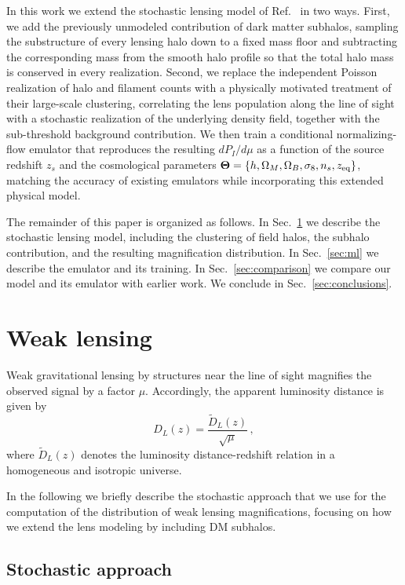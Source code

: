 \documentclass[aps,prd,10pt,nofootinbib,twocolumn,superscriptaddress,floatfix,notitlepage]{revtex4-1}
\newcommand{\vect}[1]{\boldsymbol{#1}}
\newcommand{\be}{\begin{equation}}
\newcommand{\ee}{\end{equation}}
\begin{document}
In this work we extend the stochastic lensing model of Ref.~\cite{Vaskonen:2026ubd} in two ways. First, we add the previously unmodeled contribution of dark matter subhalos, sampling the substructure of every lensing halo down to a fixed mass floor and subtracting the corresponding mass from the smooth halo profile so that the total halo mass is conserved in every realization. Second, we replace the independent Poisson realization of halo and filament counts with a physically motivated treatment of their large-scale clustering, correlating the lens population along the line of sight with a stochastic realization of the underlying density field, together with the sub-threshold background contribution. We then train a conditional normalizing-flow emulator that reproduces the resulting $dP_I/d\mu$ as a function of the source redshift $z_s$ and the cosmological parameters $\vect\Theta = \{h,\Omega_M,\Omega_B,\sigma_8,n_s,z_{\rm eq}\}$, matching the accuracy of existing emulators while incorporating this extended physical model.

The remainder of this paper is organized as follows. In Sec.~\ref{sec:lensing} we describe the stochastic lensing model, including the clustering of field halos, the subhalo contribution, and the resulting magnification distribution. In Sec.~\ref{sec:ml} we describe the emulator and its training. In Sec.~\ref{sec:comparison} we compare our model and its emulator with earlier work. We conclude in Sec.~\ref{sec:conclusions}.

\section{Weak lensing}
\label{sec:lensing}

Weak gravitational lensing by structures near the line of sight magnifies the observed signal by a factor $\mu$. Accordingly, the apparent luminosity distance is given by
\be
    D_L(z) = \frac{\tilde{D}_L(z)}{\sqrt{\mu}} \,,
\ee
where $\tilde{D}_L(z)$ denotes the luminosity distance-redshift relation in a homogeneous and isotropic universe.

In the following we briefly describe the stochastic approach that we use for the computation of the distribution of weak lensing magnifications, focusing on how we extend the lens modeling by including DM subhalos.

\subsection{Stochastic approach}
\end{document}

